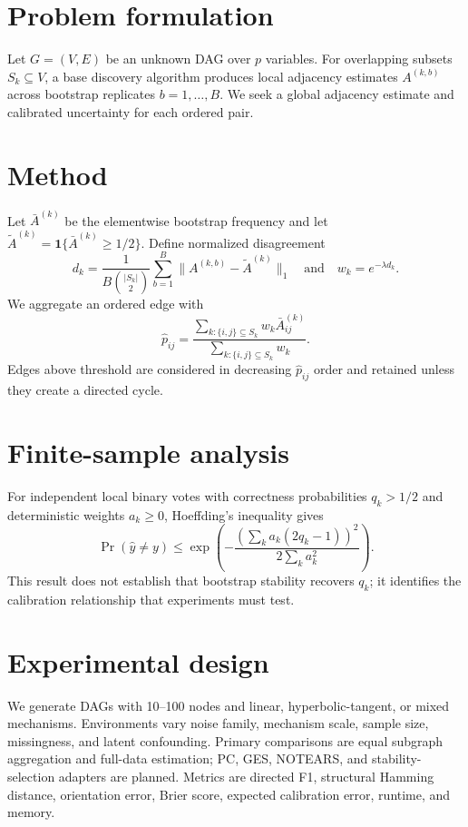 \documentclass[11pt]{article}
\begin{document}
\section{Problem formulation}
Let $G=(V,E)$ be an unknown DAG over $p$ variables. For overlapping subsets $S_k\subseteq V$, a base discovery algorithm produces local adjacency estimates $A^{(k,b)}$ across bootstrap replicates $b=1,\ldots,B$. We seek a global adjacency estimate and calibrated uncertainty for each ordered pair.

\section{Method}
Let $\bar A^{(k)}$ be the elementwise bootstrap frequency and let $\widetilde A^{(k)}=\mathbf 1\{\bar A^{(k)}\ge 1/2\}$. Define normalized disagreement
\[
d_k=\frac{1}{B{|S_k|\choose2}}\sum_{b=1}^B\|A^{(k,b)}-\widetilde A^{(k)}\|_1
\quad\text{and}\quad
w_k=e^{-\lambda d_k}.
\]
We aggregate an ordered edge with
\[
\widehat p_{ij}=\frac{\sum_{k:\{i,j\}\subseteq S_k}w_k\bar A^{(k)}_{ij}}
{\sum_{k:\{i,j\}\subseteq S_k}w_k}.
\]
Edges above threshold are considered in decreasing $\widehat p_{ij}$ order and retained unless they create a directed cycle.

\section{Finite-sample analysis}
For independent local binary votes with correctness probabilities $q_k>1/2$ and deterministic weights $a_k\ge0$, Hoeffding's inequality gives
\[
\Pr(\widehat y\ne y)\le
\exp\left(-\frac{(\sum_k a_k(2q_k-1))^2}{2\sum_k a_k^2}\right).
\]
This result does not establish that bootstrap stability recovers $q_k$; it identifies the calibration relationship that experiments must test.

\section{Experimental design}
We generate DAGs with 10--100 nodes and linear, hyperbolic-tangent, or mixed mechanisms. Environments vary noise family, mechanism scale, sample size, missingness, and latent confounding. Primary comparisons are equal subgraph aggregation and full-data estimation; PC, GES, NOTEARS, and stability-selection adapters are planned. Metrics are directed F1, structural Hamming distance, orientation error, Brier score, expected calibration error, runtime, and memory.
\end{document}
